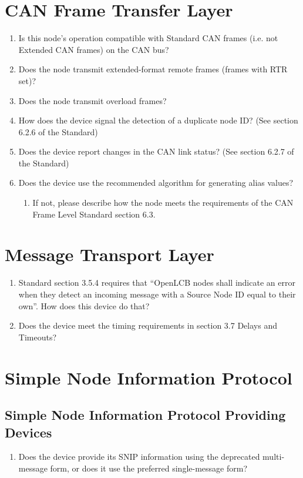 \section{CAN Frame Transfer Layer}
    \begin{enumerate}
        \item Is this node's operation compatible with Standard CAN frames
            (i.e. not Extended CAN frames) on the CAN bus?
        \item Does the node transmit extended-format remote frames (frames with RTR set)?
        \item Does the node transmit overload frames?
        \item How does the device signal the detection of a duplicate node ID?
                (See section 6.2.6 of the Standard)
        \item Does the device report changes in the CAN link status? 
                (See section 6.2.7 of the Standard)
        \item Does the device use the recommended algorithm for generating alias values?
            \begin{enumerate}
                \item If not, please describe how the node meets the requirements of the 
                    CAN Frame Level Standard section 6.3.
            \end{enumerate}
    \end{enumerate}

\section{Message Transport Layer}
    \begin{enumerate}
        \item Standard section 3.5.4 requires that ``OpenLCB nodes shall indicate an 
            error when they detect an incoming message with a Source Node ID
            equal to their own''. How does this device do that?
        \item Does the device meet the timing requirements in section 3.7 Delays and Timeouts?
    \end{enumerate}

\section{Simple Node Information Protocol}
    \subsection{Simple Node Information Protocol Providing Devices}
        \begin{enumerate}
            \item Does the device provide its SNIP information using
                the deprecated multi-message form, or does it use
                the preferred single-message form?
        \end{enumerate}
